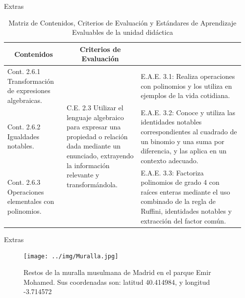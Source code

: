 \documentclass[10pt,notes,compress,usetitleprogressbar,aspectratio=1610]{beamer}
\begin{document}
\begin{frame}{Extras}
	\begin{table}[hbt]
		\centering
		\caption{Matriz de Contenidos, Criterios de Evaluación y  Estándares de Aprendizaje Evaluables de la unidad didáctica}
		\label{tbl:Matrizdetodo}
		\begin{tabular}{|p{0.24\linewidth}|p{0.3\linewidth}|p{0.42\linewidth}|}
		\hline
		 \multicolumn{1}{|c|}{Contenidos} & \multicolumn{1}{|c|}{Criterios de Evaluación} & \multicolumn{1}{c|}{}
		\\\hline

		{Cont. 2.6.1} Transformación de expresiones algebraicas. 
		&
		\multirow{3}{\linewidth}{{C.E. 2.3} Utilizar el lenguaje algebraico para expresar una propiedad o relación dada mediante un enunciado, extrayendo la información relevante y transformándola.\vfill}
		& 
		{E.A.E. 3.1}: Realiza operaciones con polinomios y los utiliza en ejemplos de la vida cotidiana.
		\\\cline{1-1} \cline{3-3} 

		{Cont. 2.6.2} Igualdades notables. 
		&
		& 
		{E.A.E. 3.2}: Conoce y utiliza las identidades notables correspondientes al cuadrado de un binomio y una suma por diferencia, y las aplica en un contexto adecuado. 
		\\\cline{1-1} \cline{3-3} 

		{Cont. 2.6.3} Operaciones elementales con polinomios. 
		&
		&
		{E.A.E. 3.3}: Factoriza polinomios de grado 4 con raíces enteras mediante el uso combinado de la regla de Ruffini, identidades notables y extracción del factor común.
		\\\hline
		\end{tabular}
	\end{table}
\end{frame}



\begin{frame}{Extras}
\begin{figure}[hbtp]
\centering
\caption{Restos de la muralla musulmana de Madrid en el parque Emir Mohamed. Sus coordenadas son: latitud
40.414984, y longitud -3.714572}
\label{img:MurallaMusulmana}
\texttt{[image: ../img/Muralla.jpg]}
\\
\end{figure}
\end{frame}
\end{document}
